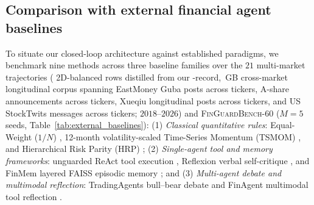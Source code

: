 \subsection{Comparison with external financial agent baselines}
\label{sec:external_baselines}
To situate our closed-loop architecture against established paradigms, we benchmark nine
methods across three baseline families over the $21$ multi-market trajectories
(\PanelBalancedRows{} 2D-balanced rows distilled from our \CorpusTotalRecords{}-record,
\CorpusTotalSizeGB{}\,GB cross-market longitudinal corpus spanning \CorpusGubaRecords{}
EastMoney Guba posts across \CorpusGubaTickers{} tickers, \CorpusAnnounceRecords{} A-share
announcements across \CorpusAnnounceTickers{} tickers, \CorpusXueqiuRecords{} Xueqiu
longitudinal posts across \CorpusXueqiuTickers{} tickers, and \CorpusStockTwitsRecords{} US
StockTwits messages across \CorpusStockTwitsTickers{} tickers; $2018\text{--}2026$) and
\textsc{FinGuardBench-60} ($M=5$ seeds, Table~\ref{tab:external_baselines}):
(1) \emph{Classical quantitative rules}: Equal-Weight ($1/N$) \cite{demiguel2009optimal},
12-month volatility-scaled Time-Series Momentum (TSMOM) \cite{moskowitz2012time}, and
Hierarchical Risk Parity (HRP) \cite{lopez2016building};
(2) \emph{Single-agent tool and memory frameworks}: unguarded ReAct tool execution
\cite{yao2023react}, Reflexion verbal self-critique \cite{shinn2023reflexion}, and FinMem
layered FAISS episodic memory \cite{yu2024finmem}; and
(3) \emph{Multi-agent debate and multimodal reflection}: TradingAgents bull--bear debate
\cite{xiao2024tradingagents} and FinAgent multimodal tool reflection \cite{zhang2024finagent}.

